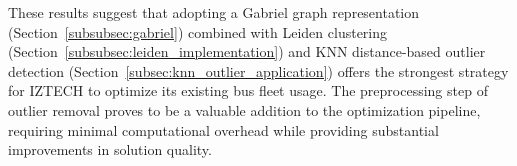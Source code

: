 These results suggest that adopting a Gabriel graph representation (Section~\ref{subsubsec:gabriel}) combined with Leiden clustering (Section~\ref{subsubsec:leiden_implementation}) and KNN distance-based outlier detection (Section~\ref{subsec:knn_outlier_application}) offers the strongest strategy for IZTECH to optimize its existing bus fleet usage. The preprocessing step of outlier removal proves to be a valuable addition to the optimization pipeline, requiring minimal computational overhead while providing substantial improvements in solution quality.


